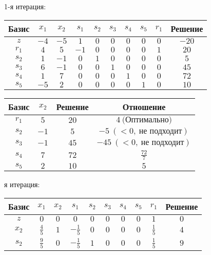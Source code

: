 \documentclass{article}%
\begin{document}
\begin{flushleft}%
1{-}я итерация: %
\newline%
\newline%
\renewcommand{\arraystretch}{1.3}%
\begin{tabular}{|c|cccccccc|c|}%
\hline%
Базис&$x_{1}$&$x_{2}$&$s_{1}$&$s_{2}$&$s_{3}$&$s_{4}$&$s_{5}$&$r_{1}$&Решение\\%
\hline%
$z$&$-4$&$-5$&$1$&$0$&$0$&$0$&$0$&$0$&$-20$\\%
\hline%
$r_{1}$&$4$&$5$&$-1$&$0$&$0$&$0$&$0$&$1$&$20$\\%
$s_{2}$&$1$&$-1$&$0$&$1$&$0$&$0$&$0$&$0$&$5$\\%
$s_{3}$&$6$&$-1$&$0$&$0$&$1$&$0$&$0$&$0$&$45$\\%
$s_{4}$&$1$&$7$&$0$&$0$&$0$&$1$&$0$&$0$&$72$\\%
$s_{5}$&$-5$&$2$&$0$&$0$&$0$&$0$&$1$&$0$&$10$\\%
\hline%
\end{tabular}%
\newline%
\newline%
\newline%
\begin{tabular}{|cccc|}%
\hline%
Базис&$x_{2}$&Решение&Отношение\\%
\hline%
$r_{1}$&$5$&$20$&$4\: \text{(Оптимально)}$\\%
$s_{2}$&$-1$&$5$&$-5\: (< 0, \: \text{не подходит})$\\%
$s_{3}$&$-1$&$45$&$-45\: (< 0, \: \text{не подходит})$\\%
$s_{4}$&$7$&$72$&$\frac{72}{7}$\\%
$s_{5}$&$2$&$10$&$5$\\%
\hline%
\end{tabular}%
\newline%
\newline%
я итерация: %
\newline%
\newline%
\renewcommand{\arraystretch}{1.3}%
\begin{tabular}{|c|cccccccc|c|}%
\hline%
Базис&$x_{1}$&$x_{2}$&$s_{1}$&$s_{2}$&$s_{3}$&$s_{4}$&$s_{5}$&$r_{1}$&Решение\\%
\hline%
$z$&$0$&$0$&$0$&$0$&$0$&$0$&$0$&$1$&$0$\\%
\hline%
$x_{2}$&$\frac{4}{5}$&$1$&$-\frac{1}{5}$&$0$&$0$&$0$&$0$&$\frac{1}{5}$&$4$\\%
$s_{2}$&$\frac{9}{5}$&$0$&$-\frac{1}{5}$&$1$&$0$&$0$&$0$&$\frac{1}{5}$&$9$\\%

\end{tabular}
\end{flushleft}
\end{document}

